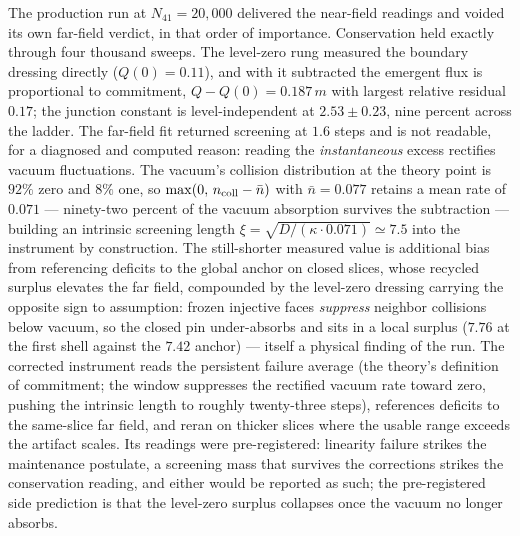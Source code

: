 \documentclass[11pt]{article}
\begin{document}
The production run at $N_{41}=20{,}000$ delivered the near-field readings and voided its own far-field verdict, in that order of importance. Conservation held exactly through four thousand sweeps. The level-zero rung measured the boundary dressing directly ($Q(0)=0.11$), and with it subtracted the emergent flux is proportional to commitment, $Q-Q(0)=0.187\,m$ with largest relative residual $0.17$; the junction constant is level-independent at $2.53\pm0.23$, nine percent across the ladder. The far-field fit returned screening at $1.6$ steps and is not readable, for a diagnosed and computed reason: reading the \emph{instantaneous} excess rectifies vacuum fluctuations. The vacuum's collision distribution at the theory point is $92\%$ zero and $8\%$ one, so $\max(0,\,n_{\rm coll}-\bar n)$ with $\bar n=0.077$ retains a mean rate of $0.071$ --- ninety-two percent of the vacuum absorption survives the subtraction --- building an intrinsic screening length $\xi=\sqrt{D/(\kappa\cdot0.071)}\simeq7.5$ into the instrument by construction. The still-shorter measured value is additional bias from referencing deficits to the global anchor on closed slices, whose recycled surplus elevates the far field, compounded by the level-zero dressing carrying the opposite sign to assumption: frozen injective faces \emph{suppress} neighbor collisions below vacuum, so the closed pin under-absorbs and sits in a local surplus ($7.76$ at the first shell against the $7.42$ anchor) --- itself a physical finding of the run. The corrected instrument reads the persistent failure average (the theory's definition of commitment; the window suppresses the rectified vacuum rate toward zero, pushing the intrinsic length to roughly twenty-three steps), references deficits to the same-slice far field, and reran on thicker slices where the usable range exceeds the artifact scales. Its readings were pre-registered: linearity failure strikes the maintenance postulate, a screening mass that survives the corrections strikes the conservation reading, and either would be reported as such; the pre-registered side prediction is that the level-zero surplus collapses once the vacuum no longer absorbs.
\end{document}
